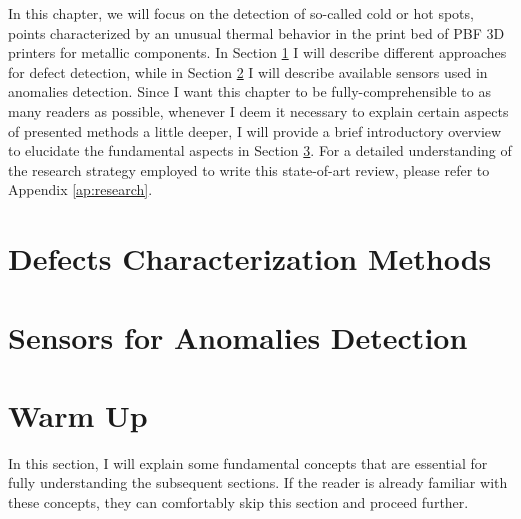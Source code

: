 In this chapter, we will focus on the detection of so-called cold or hot spots, points characterized by an unusual thermal behavior in the print bed of PBF 3D printers for metallic components. In Section \ref{sec:comelotrovo} I will describe different approaches for defect detection, while in Section \ref{sec:sensoriniiniini} I will describe available sensors used in anomalies detection. Since I want this chapter to be fully-comprehensible to as many readers as possible, whenever I deem it necessary to explain certain aspects of presented methods a little deeper, I will provide a brief introductory overview to elucidate the fundamental aspects in Section \ref{sec:introperritardati}. For a detailed understanding of the research strategy employed to write this state-of-art review, please refer to Appendix \ref{ap:research}. 

\section{Defects Characterization Methods}
\label{sec:comelotrovo}

\section{Sensors for Anomalies Detection}
\label{sec:sensoriniiniini}


\section{Warm Up}
\label{sec:introperritardati}
In this section, I will explain some fundamental concepts that are essential for fully understanding the subsequent sections. If the reader is already familiar with these concepts, they can comfortably skip this section and proceed further. 

